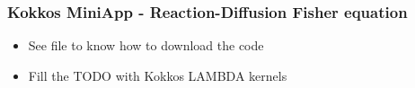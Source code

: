 \begin{frame}
  \frametitle{Kokkos MiniApp - Reaction-Diffusion Fisher equation}

  \begin{itemize}
  \item See file  to know how
    to download the code
  \item Fill the TODO with Kokkos LAMBDA kernels
  \end{itemize}
  
\end{frame}